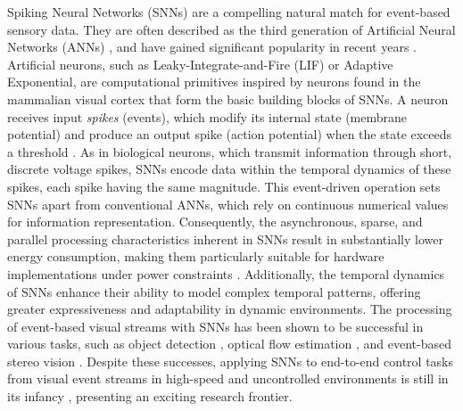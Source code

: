 \documentclass{article}
\begin{document}
Spiking Neural Networks (SNNs) are a compelling natural match for event-based sensory data. They are often described as the third generation of Artificial Neural Networks (ANNs) \cite{maassNetworksSpikingNeurons1997a}, and have gained significant popularity in recent years \cite{gallegoEventbasedVisionSurvey2022}. Artificial neurons, such as Leaky-Integrate-and-Fire (LIF) or Adaptive Exponential, are computational primitives inspired by neurons found in the mammalian visual cortex that form the basic building blocks of SNNs. A neuron receives input \textit{spikes }(events), which modify its internal state (membrane potential) and produce an output spike (action potential) when the state exceeds a threshold \cite{gallegoEventbasedVisionSurvey2022}. As in biological neurons, which transmit information through short, discrete voltage spikes, SNNs encode data within the temporal dynamics of these spikes, each spike having the same magnitude. This event-driven operation sets SNNs apart from conventional ANNs, which rely on continuous numerical values for information representation. Consequently, the asynchronous, sparse, and parallel processing characteristics inherent in SNNs result in substantially lower energy consumption, making them particularly suitable for hardware implementations under power constraints \cite{farsaLowCostHighSpeedNeuromorphic2019, siddiqueLowCostNeuromorphic2023}. Additionally, the temporal dynamics of SNNs enhance their ability to model complex temporal patterns, offering greater expressiveness and adaptability in dynamic environments. The processing of event-based visual streams with SNNs has been shown to be successful in various tasks, such as object detection \cite{iaboniEventbasedSpikingNeural2024}, optical flow estimation \cite{cuadradoOpticalFlowEstimation2023}, and event-based stereo vision \cite{osswaldSpikingNeuralNetwork2017}. Despite these successes, applying SNNs to end-to-end control tasks from visual event streams in high-speed and uncontrolled environments is still in its infancy \cite{stroobantsNeuromorphicAttitudeEstimation2025, paredes-vallesFullyNeuromorphicVision2023b, onizTrajectoryControlQuadrotors2024}, presenting an exciting research frontier. 
\end{document}

